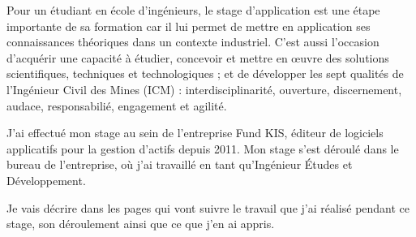 Pour un étudiant en école d'ingénieurs, le stage d'application est une étape importante de sa formation car il lui permet de mettre en application ses connaissances théoriques dans un contexte industriel. C'est aussi l'occasion d'acquérir une capacité à étudier, concevoir et mettre en \oe uvre des solutions scientifiques, techniques et technologiques ; et de développer les sept qualités de l'Ingénieur Civil des Mines (ICM) : interdisciplinarité, ouverture, discernement, audace, responsabilié, engagement et agilité.

\vspace{3mm}

J'ai effectué mon stage au sein de l'entreprise Fund KIS, éditeur de logiciels applicatifs pour la gestion d'actifs depuis 2011. Mon stage s'est déroulé dans le bureau de l'entreprise, où j'ai travaillé en tant qu'Ingénieur \'Etudes et Développement.

\vspace{3mm}

Je vais décrire dans les pages qui vont suivre le travail que j'ai réalisé pendant ce stage, son déroulement ainsi que ce que j'en ai appris.
